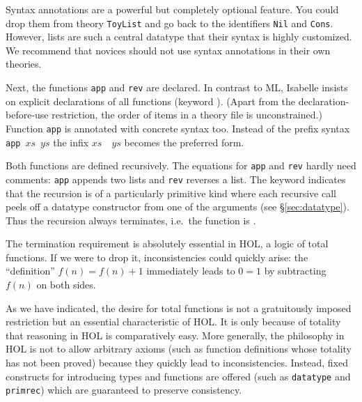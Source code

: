 \begin{warn}
  Syntax annotations are a powerful but completely optional feature. You
  could drop them from theory \texttt{ToyList} and go back to the identifiers
  \texttt{Nil} and \texttt{Cons}. However, lists are such a central datatype
  that their syntax is highly customized. We recommend that novices should
  not use syntax annotations in their own theories.
\end{warn}

Next, the functions \texttt{app} and \texttt{rev} are declared. In contrast
to ML, Isabelle insists on explicit declarations of all functions (keyword
).  (Apart from the declaration-before-use restriction,
the order of items in a theory file is unconstrained.) Function \texttt{app}
is annotated with concrete syntax too. Instead of the prefix syntax
\texttt{app}~$xs$~$ys$ the infix $xs$~\texttt{\at}~$ys$ becomes the preferred
form.

Both functions are defined recursively. The equations for \texttt{app} and
\texttt{rev} hardly need comments: \texttt{app} appends two lists and
\texttt{rev} reverses a list.  The keyword  indicates that
the recursion is of a particularly primitive kind where each recursive call
peels off a datatype constructor from one of the arguments (see
\S\ref{sec:datatype}).  Thus the recursion always terminates, i.e.\ the
function is .

The termination requirement is absolutely essential in HOL, a logic of total
functions. If we were to drop it, inconsistencies could quickly arise: the
``definition'' $f(n) = f(n)+1$ immediately leads to $0 = 1$ by subtracting
$f(n)$ on both sides.

\begin{warn}
  As we have indicated, the desire for total functions is not a gratuitously
  imposed restriction but an essential characteristic of HOL. It is only
  because of totality that reasoning in HOL is comparatively easy.  More
  generally, the philosophy in HOL is not to allow arbitrary axioms (such as
  function definitions whose totality has not been proved) because they
  quickly lead to inconsistencies. Instead, fixed constructs for introducing
  types and functions are offered (such as \texttt{datatype} and
  \texttt{primrec}) which are guaranteed to preserve consistency.
\end{warn}

